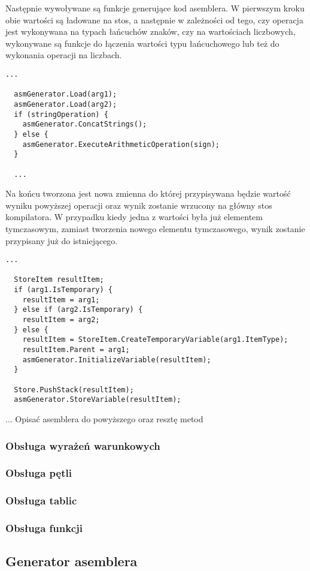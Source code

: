 \par Następnie wywoływane są funkcje generujące kod asemblera. W pierwszym kroku obie wartości są ładowane na stos, a następnie w zależności od tego, czy operacja jest wykonywana na typach łańcuchów znaków, czy na wartościach liczbowych, wykonywane są funkcje do łączenia wartości typu łańcuchowego lub też do wykonania operacji na liczbach.

\begin{lstlisting}[language=CSharp, caption=Implementacja funkcji obsługującej działania matematyczne cz.2, label=alg:arytm3]
  ...

  asmGenerator.Load(arg1);
  asmGenerator.Load(arg2);
  if (stringOperation) {
    asmGenerator.ConcatStrings();
  } else {
    asmGenerator.ExecuteArithmeticOperation(sign);
  }

  ...
\end{lstlisting}

\par Na końcu tworzona jest nowa zmienna do której przypisywana będzie wartość wyniku powyższej operacji oraz wynik zostanie wrzucony na główny stos kompilatora. W przypadku kiedy jedna z wartości była już elementem tymczasowym, zamiast tworzenia nowego elementu tymczasowego, wynik zostanie przypisany już do istniejącego.

\begin{lstlisting}[language=CSharp, caption=Implementacja funkcji obsługującej działania matematyczne cz.3, label=alg:arytm4]
  ...

  StoreItem resultItem;
  if (arg1.IsTemporary) {
    resultItem = arg1;
  } else if (arg2.IsTemporary) {
    resultItem = arg2;
  } else {
    resultItem = StoreItem.CreateTemporaryVariable(arg1.ItemType);
    resultItem.Parent = arg1;
    asmGenerator.InitializeVariable(resultItem);
  }

  Store.PushStack(resultItem);
  asmGenerator.StoreVariable(resultItem);
\end{lstlisting}

\par ... Opisać asemblera do powyższego oraz resztę metod

\subsubsection{Obsługa wyrażeń warunkowych}
\subsubsection{Obsługa pętli}
\subsubsection{Obsługa tablic}
\subsubsection{Obsługa funkcji}

\subsection{Generator asemblera}
